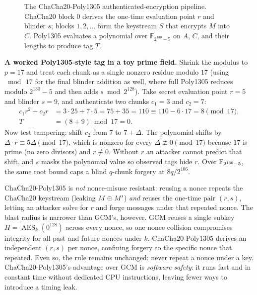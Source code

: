 \begin{figure}[htbp]
\caption{The ChaCha20-Poly1305 authenticated-encryption pipeline. ChaCha20 block 0 derives the one-time evaluation point $r$ and blinder $s$; blocks $1, 2, \dots$ form the keystream $S$ that encrypts $M$ into $C$. Poly1305 evaluates a polynomial over $\mathbb{F}_{2^{130}-5}$ on $A$, $C$, and their lengths to produce tag $T$.}
\label{ch16:chacha-fig}
\end{figure}

\begin{labbox}
\textbf{A worked Poly1305-style tag in a toy prime field.} Shrink the modulus to $p = 17$ and treat each chunk as a single nonzero residue modulo $17$ (using $\bmod\,17$ for the final blinder addition as well, where full Poly1305 reduces modulo $2^{130}-5$ and then adds $s \bmod 2^{128}$). Take secret evaluation point $r = 5$ and blinder $s = 9$, and authenticate two chunks $c_1 = 3$ and $c_2 = 7$:
\begin{align*}
c_1 r^2 + c_2 r &= 3 \cdot 25 + 7 \cdot 5 = 75 + 35 = 110 \equiv 110 - 6 \cdot 17 = 8 \pmod{17}, \\
T &= (8 + 9) \bmod 17 = 0.
\end{align*}
Now test tampering: shift $c_2$ from $7$ to $7 + \Delta$. The polynomial shifts by $\Delta \cdot r \equiv 5\Delta \pmod{17}$, which is nonzero for every $\Delta \not\equiv 0 \pmod{17}$ because $17$ is prime (no zero divisors) and $r \not\equiv 0$. Without $r$ an attacker cannot predict that shift, and $s$ masks the polynomial value so observed tags hide $r$. Over $\mathbb{F}_{2^{130}-5}$, the same root bound caps a blind $q$-chunk forgery at $8q / 2^{106}$.
\end{labbox}

\begin{focusbox}
ChaCha20-Poly1305 is \emph{not} nonce-misuse resistant: reusing a nonce repeats the ChaCha20 keystream (leaking $M \oplus M'$) \emph{and} reuses the one-time pair $(r,s)$, letting an attacker solve for $r$ and forge messages under that repeated nonce. The blast radius is narrower than GCM's, however. GCM reuses a single subkey $H = \operatorname{AES}_k(0^{128})$ across every nonce, so one nonce collision compromises integrity for all past and future nonces under $k$. ChaCha20-Poly1305 derives an independent $(r,s)$ per nonce, confining forgery to the specific nonce that repeated. Even so, the rule remains unchanged: never repeat a nonce under a key. ChaCha20-Poly1305's advantage over GCM is \emph{software safety}: it runs fast and in constant time without dedicated CPU instructions, leaving fewer ways to introduce a timing leak.
\end{focusbox}

